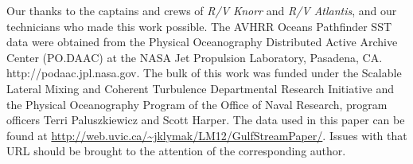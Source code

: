 \documentclass[draft,grl]{agutex2015}
\begin{document}
\begin{article}
%
%
%
%
%
%
%

\begin{acknowledgments}
Our thanks to the captains and crews of \emph{R/V Knorr} and \emph{R/V Atlantis}, and our technicians who made this work possible.  The AVHRR Oceans Pathfinder SST data were obtained from the Physical Oceanography Distributed Active Archive Center (PO.DAAC) at the NASA Jet Propulsion Laboratory, Pasadena, CA. http://podaac.jpl.nasa.gov. The bulk of this work was funded under the Scalable Lateral Mixing and Coherent Turbulence Departmental Research Initiative and the Physical Oceanography Program of the Office of Naval Research, program officers Terri Paluszkiewicz and Scott Harper.  The data used in this paper can be found at \url{http://web.uvic.ca/~jklymak/LM12/GulfStreamPaper/}.  Issues with that URL should be brought to the attention of the corresponding author.  

\end{acknowledgments}



\end{article}
\end{document}
